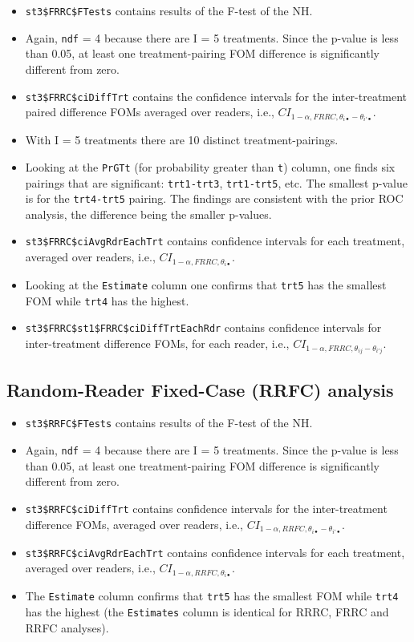\documentclass[
]{book}
\begin{document}
\begin{itemize}
\item
  \texttt{st3\$FRRC\$FTests} contains results of the F-test of the NH.
\item
  Again, \texttt{ndf} = 4 because there are I = 5 treatments. Since the p-value is less than 0.05, at least one treatment-pairing FOM difference is significantly different from zero.
\item
  \texttt{st3\$FRRC\$ciDiffTrt} contains the confidence intervals for the inter-treatment paired difference FOMs averaged over readers, i.e., \(CI_{1-\alpha,FRRC,\theta_{i \bullet} - \theta_{i' \bullet}}\).
\item
  With I = 5 treatments there are 10 distinct treatment-pairings.
\item
  Looking at the \texttt{PrGTt} (for probability greater than \texttt{t}) column, one finds six pairings that are significant: \texttt{trt1-trt3}, \texttt{trt1-trt5}, etc. The smallest p-value is for the \texttt{trt4-trt5} pairing. The findings are consistent with the prior ROC analysis, the difference being the smaller p-values.
\item
  \texttt{st3\$FRRC\$ciAvgRdrEachTrt} contains confidence intervals for each treatment, averaged over readers, i.e., \(CI_{1-\alpha,FRRC,\theta_{i \bullet}}\).
\item
  Looking at the \texttt{Estimate} column one confirms that \texttt{trt5} has the smallest FOM while \texttt{trt4} has the highest.
\item
  \texttt{st3\$FRRC\$st1\$FRRC\$ciDiffTrtEachRdr} contains confidence intervals for inter-treatment difference FOMs, for each reader, i.e., \(CI_{1-\alpha,FRRC,\theta_{i j} - \theta_{i' j}}\).
\end{itemize}

\hypertarget{ORApplications-RRFC-dataset04-FROC}{%
\subsection{Random-Reader Fixed-Case (RRFC) analysis}\label{ORApplications-RRFC-dataset04-FROC}}

\begin{itemize}
\item
  \texttt{st3\$RRFC\$FTests} contains results of the F-test of the NH.
\item
  Again, \texttt{ndf} = 4 because there are I = 5 treatments. Since the p-value is less than 0.05, at least one treatment-pairing FOM difference is significantly different from zero.
\item
  \texttt{st3\$RRFC\$ciDiffTrt} contains confidence intervals for the inter-treatment difference FOMs, averaged over readers, i.e., \(CI_{1-\alpha,RRFC,\theta_{i \bullet} - \theta_{i' \bullet}}\).
\item
  \texttt{st3\$RRFC\$ciAvgRdrEachTrt} contains confidence intervals for each treatment, averaged over readers, i.e., \(CI_{1-\alpha,RRFC,\theta_{i \bullet}}\).
\item
  The \texttt{Estimate} column confirms that \texttt{trt5} has the smallest FOM while \texttt{trt4} has the highest (the \texttt{Estimates} column is identical for RRRC, FRRC and RRFC analyses).
\end{itemize}
\end{document}
